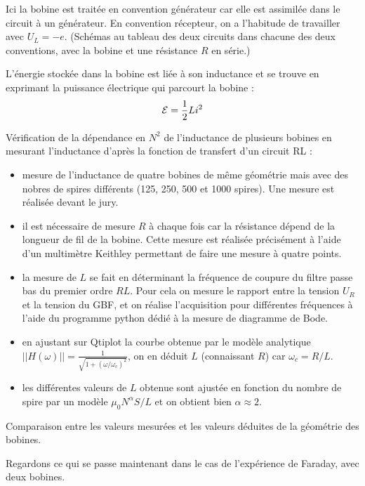 Ici la bobine est traitée en convention générateur car elle est assimilée dans le circuit à un générateur.
En convention récepteur, on a l'habitude de travailler avec $U_L = -e$.
(Schémas au tableau des deux circuits dans chacune des deux conventions, avec la bobine et une résistance $R$ en série.)

L'énergie stockée dans la bobine est liée à son inductance et se trouve en exprimant la puissance électrique qui parcourt la bobine :
\begin{equation}
{\cal{E}} = \frac{1}{2}Li^2
\end{equation}

\begin{experience}
Vérification de la dépendance en $N^2$ de l'inductance de plusieurs bobines en mesurant l'inductance d'après la fonction de transfert d'un circuit RL :
\begin{itemize}
\item mesure de l'inductance de quatre bobines de même géométrie mais avec des nobres de spires différents (125, 250, 500 et 1000 spires).
Une mesure est réalisée devant le jury.
\item il est nécessaire de mesure $R$ à chaque fois car la résistance dépend de la longueur de fil de la bobine. Cette mesure est réalisée précisément à l'aide d'un multimètre Keithley permettant de faire une mesure à quatre points.
\item la mesure de $L$ se fait en déterminant la fréquence de coupure du filtre passe bas du premier ordre $RL$.
Pour cela on mesure le rapport entre la tension $U_R$ et la tension du GBF, et on réalise l'acquisition pour différentes fréquences à l'aide du programme python dédié à la mesure de diagramme de Bode.
\item en ajustant sur Qtiplot la courbe obtenue par le modèle analytique $||H(\omega)|| = \frac{1}{\sqrt{1+(\omega/\omega_c)^2}}$, on en déduit $L$ (connaissant $R$) car $\omega_c = R/L$.
\item les différentes valeurs de $L$ obtenue sont ajustée en fonction du nombre de spire par un modèle $\mu_0N^\alpha S/L$ et on obtient bien $\alpha\approx2$.
\end{itemize}
Comparaison entre les valeurs mesurées et les valeurs déduites de la géométrie des bobines.
\end{experience}

\begin{transition}
Regardons ce qui se passe maintenant dans le cas de l'expérience de Faraday, avec deux bobines.
\end{transition}

